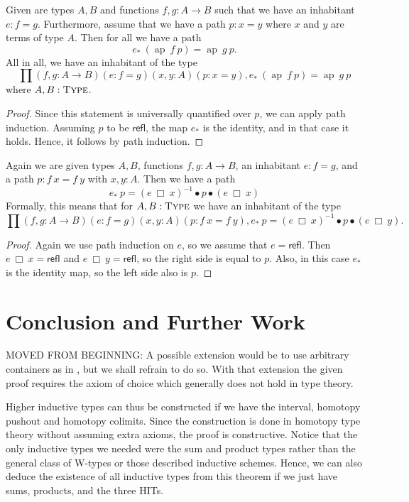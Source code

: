 \documentclass[a4paper,UKenglish]{lipics-v2016}
\newcommand{\Boperator}[1]{\mathsf{#1}}
\newcommand{\fpath}[0]{\> \Box \>}
\newcommand{\conc}[0]{\bullet}
\newcommand{\ap}[0]{\operatorname{ap}}
\newcommand{\refl}[0]{\Boperator{refl}}
\newcommand{\Type}[0]{\operatorname{\textsc{Type}}}
\begin{document}
\begin{lemma}
\label{lem:pathext}
Given are types $A, B$ and functions $f, g : A \rightarrow B$ such that we have an inhabitant $e : f = g$.
Furthermore, assume that we have a path $p : x = y$ where $x$ and $y$ are terms of type $A$.
Then for all we have a path
\[
e_* \> (\ap \> f \> p) = \ap \> g \> p.
\]
All in all, we have an inhabitant of the type
\[
\prod (f, g : A \rightarrow B) (e : f = g) (x, y : A) (p : x = y), e_* \> (\ap \> f \> p) = \ap \> g \> p
\]
where $A, B : \Type$.
\end{lemma}

\begin{proof}
Since this statement is universally quantified over $p$, we can apply path induction.
Assuming $p$ to be $\refl$, the map $e_*$ is the identity, and in that case it holds.
Hence, it follows by path induction.
\end{proof}

\begin{lemma}
\label{lem:funTrans}
Again we are given types $A, B$, functions $f, g : A \rightarrow B$, an inhabitant $e : f = g$, and a path $p : f \> x = f \> y$ with $x, y : A$.
Then we have a path 
\[
e_* \> p = (e \fpath x)^{-1} \conc p \conc (e \fpath x)
\]
Formally, this means that for $A, B : \Type$ we have an inhabitant of the type
\[
\prod (f, g : A \rightarrow B) (e : f = g) (x, y : A) (p : f \> x = f \> y), e_* \> p = (e \fpath x)^{-1} \conc p \conc (e \fpath y).
\]
\end{lemma}

\begin{proof}
Again we use path induction on $e$, so we assume that $e = \refl$.
Then $e \fpath x = \refl$ and $e \fpath y = \refl$, so the right side is equal to $p$.
Also, in this case $e_*$ is the identity map, so the left side also is $p$.
\end{proof}

\section{Conclusion and Further Work}

MOVED FROM BEGINNING: A possible extension would be to use arbitrary containers as in \cite{abbott2005containers}, but we shall refrain to do so.
With that extension the given proof requires the axiom of choice which generally does not hold in type theory.


Higher inductive types can thus be constructed if we have the interval, homotopy pushout and homotopy colimits.
Since the construction is done in homotopy type theory without assuming extra axioms, the proof is constructive.
Notice that the only inductive types we needed were the sum and product types rather than the general class of W-types or those described inductive schemes.
Hence, we can also deduce the existence of all inductive types from this theorem if we just have sums, products, and the three HITs. 
\end{document}
